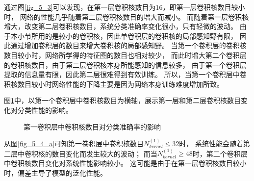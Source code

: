 通过图\ref{fig_5_3}可以发现，在第一层卷积核数目为$16$，即第一层卷积核数目较小时，
网络的性能几乎随着第二层卷积核数目的增大而减小。
而随着第一层卷积核增大，改变第二层卷积核数目，系统分类准确率变化很小，只有轻微的波动。
由于本小节所用的是较小的卷积核，因此单卷积层的卷积核的局部感知野有限，
因此通过增加卷积层的数目来增大卷积核的局部感知野。
当第一个卷积层的卷积核数目较小时，网络所学得的特征图的数目也相对较少，
而此时增大第二个卷积层的卷积核数目，由于第二层卷积核本身所能感知的信息较多，
由于第一个卷积层提取的信息量有限，因此第二层很难得到有效训练。
所以，当第一个卷积层中卷积核数目较小时网络性能的下降主要是因为网络本身训练难度增加所致。\par

图\ref{fig_5_4}中，以第一个卷积层中卷积核数目为横轴，展示第一层和第二层卷积核数目变化对分类性能的影响。\par
\begin{figure}[!h]
	\centering
	\caption{第一卷积层中卷积核数目对分类准确率的影响}
	\label{fig_5_4}
\end{figure}
从图\ref{fig_5_4_a}可知第一卷积层中卷积核数目$N_{kernel}^{(1)} \leq 32$时，
系统性能会随着第二层中卷积核的数目变化而发生较大的波动；
而当$N_{kernel}^{(1)} \geq 48$时，第二个卷积层中卷积核数目变化对系统性能影响较小。
这可能是由于在第一层卷积核数目较小时，偏差主导了模型的泛化性能。\par

